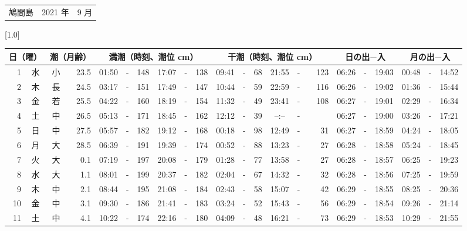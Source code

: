 \documentclass[12pt,a4j]{jsarticle}
\begin{document}
 \begin{table}[htbp]
 \begin{center}
 \begin{tabular}{lcc}
 \LARGE{鳩間島}  & \large{2021 年} & \large{ 9 月} \\
 \end{tabular}
 \end{center}
 \begin{center}
    \scalebox{0.7}[1.0]{
    \begin{tabular}{|rc|cr|ccrccr|ccrccr|ccc|ccc|}
    \hline
    \multicolumn{2}{|c|}{日（曜）} & \multicolumn{2}{c|}{潮（月齢）} & \multicolumn{6}{c|}{満潮（時刻、潮位 cm）} & \multicolumn{6}{c|}{干潮（時刻、潮位 cm）} & \multicolumn{3}{c|}{日の出−入} &  \multicolumn{3}{c|}{月の出−入}\\
 \hline
 1 & 水 & 小 & 23.5 &  01:50 &-& 148 &  17:07 &-& 138 &  09:41 &-&  68 &  21:55 &-& 123 & 06:26 & -& 19:03 & 00:48 & -& 14:52 \\
 2 & 木 & 長 & 24.5 &  03:17 &-& 151 &  17:49 &-& 147 &  10:44 &-&  59 &  22:59 &-& 116 & 06:26 & -& 19:02 & 01:36 & -& 15:44 \\
 3 & 金 & 若 & 25.5 &  04:22 &-& 160 &  18:19 &-& 154 &  11:32 &-&  49 &  23:41 &-& 108 & 06:27 & -& 19:01 & 02:29 & -& 16:34 \\
 4 & 土 & 中 & 26.5 &  05:13 &-& 171 &  18:45 &-& 162 &  12:12 &-&  39 &  --:-- &-&~~~~~ & 06:27 & -& 19:00 & 03:26 & -& 17:21 \\
 5 & 日 & 中 & 27.5 &  05:57 &-& 182 &  19:12 &-& 168 &  00:18 &-&  98 &  12:49 &-&  31 & 06:27 & -& 18:59 & 04:24 & -& 18:05 \\
 6 & 月 & 大 & 28.5 &  06:39 &-& 191 &  19:39 &-& 174 &  00:52 &-&  88 &  13:23 &-&  27 & 06:28 & -& 18:58 & 05:24 & -& 18:45 \\
 7 & 火 & 大 &  0.1 &  07:19 &-& 197 &  20:08 &-& 179 &  01:28 &-&  77 &  13:58 &-&  27 & 06:28 & -& 18:57 & 06:25 & -& 19:23 \\
 8 & 水 & 大 &  1.1 &  08:01 &-& 199 &  20:37 &-& 182 &  02:04 &-&  67 &  14:32 &-&  32 & 06:28 & -& 18:56 & 07:25 & -& 19:59 \\
 9 & 木 & 中 &  2.1 &  08:44 &-& 195 &  21:08 &-& 184 &  02:43 &-&  58 &  15:07 &-&  42 & 06:29 & -& 18:55 & 08:25 & -& 20:36 \\
10 & 金 & 中 &  3.1 &  09:30 &-& 186 &  21:41 &-& 183 &  03:24 &-&  52 &  15:43 &-&  56 & 06:29 & -& 18:54 & 09:26 & -& 21:14 \\
11 & 土 & 中 &  4.1 &  10:22 &-& 174 &  22:16 &-& 180 &  04:09 &-&  48 &  16:21 &-&  73 & 06:29 & -& 18:53 & 10:29 & -& 21:55 \\

\end{tabular}}
\end{center}
\end{table}
\end{document}
